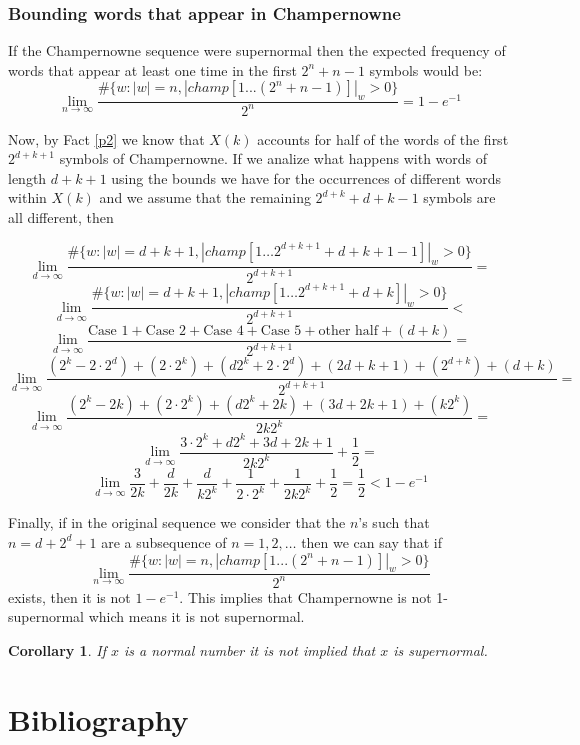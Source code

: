 \documentclass[11pt,a4paper,twoside]{tesis}
\newtheorem{corollary}{Corollary}[theorem]
\theoremstyle{definition}
\begin{document}
\subsection{Bounding words that appear in Champernowne}

If the Champernowne sequence were supernormal then the expected frequency of words that appear at least one time in the first $2^n + n -1$ symbols would be:
$$\lim_{n\to\infty} \frac{\#\{w: |w| = n  , |champ[1...(2^n+n-1)]|_w > 0\}}{2^n}  = 1 - e^{-1}$$


Now, by Fact \ref{p2} we know that $X(k)$ accounts for half of the words of the first $2^{d+k+1}$ symbols of Champernowne. 
If we analize what happens with words of length $d+k+1$ using the bounds we have for the occurrences of different words within $X(k)$ and we assume that the remaining $2^{d+k} + d + k - 1$  symbols are all different, then



$$\lim_{d\to\infty} \frac{\#\{w : |w| = d+k+1, |champ[1 \dots 2^{d+k+1}+d+k+1-1]|_w > 0 \}}{2^{d+k+1}} =$$
$$\lim_{d\to\infty} \frac{\#\{w : |w| = d+k+1, |champ[1 \dots 2^{d+k+1}+d+k]|_w > 0 \}}{2^{d+k+1}} <$$
$$\lim_{d\to\infty} \frac{ \textrm{Case 1} + \textrm{Case 2}+ \textrm{Case 4} + \textrm{Case 5} + \textrm{other half} + (d + k) }{2^{d+k+1}} =$$
$$\lim_{d\to\infty} \frac{(2^k - 2\cdot 2^d) + (2 \cdot 2^k)+ (d2^k + 2 \cdot 2^d) + (2d+k+1) + (2^{d+k}) + (d + k) }{2^{d+k+1}} =$$
$$\lim_{d\to\infty} \frac{(2^k - 2k) + (2 \cdot 2^k)+ (d2^k + 2k) + (3d+2k+1) + (k2^{k})}{2k2^{k}} =$$
$$\lim_{d\to\infty} \frac{3\cdot2^k + d2^k  + 3d+2k+1}{2k2^{k}} + \frac{1}{2} =$$
$$\lim_{d\to\infty} \frac{3}{2k} + \frac{d}{2k} + \frac{d}{k2^{k}} + \frac{1}{2\cdot2^{k}} + \frac{1}{2k2^{k}} + \frac{1}{2} = \frac{1}{2} < 1 - e^{-1}$$


Finally, if in the original sequence we consider that the $n$'s such that $n = d + 2^d + 1$ are a subsequence of $n=1,2,\dots$ then we can say that if
$$\lim_{n\to\infty} \frac{\#\{w: |w| = n  , |champ[1...(2^n+n-1)]|_w > 0\}}{2^n}$$
exists, then it is not $1 - e^{-1}$.
This implies that Champernowne is not 1-supernormal which means it is not supernormal.

\begin{corollary}
If $x$ is a normal number it is not implied that $x$ is supernormal.
\end{corollary}



\chapter{Bibliography}
\backmatter


\end{document}

